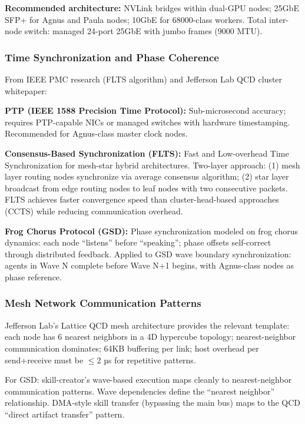 \documentclass[11pt,letterpaper]{article}
\begin{document}
\textbf{Recommended architecture:} NVLink bridges within dual-GPU nodes; 25GbE SFP+ for Agnus and Paula nodes; 10GbE for 68000-class workers. Total inter-node switch: managed 24-port 25GbE with jumbo frames (9000 MTU).

\subsubsection{Time Synchronization and Phase Coherence}

From IEEE PMC research (FLTS algorithm) and Jefferson Lab QCD cluster whitepaper:

\textbf{PTP (IEEE 1588 Precision Time Protocol):} Sub-microsecond accuracy; requires PTP-capable NICs or managed switches with hardware timestamping. Recommended for Agnus-class master clock nodes.

\textbf{Consensus-Based Synchronization (FLTS):} Fast and Low-overhead Time Synchronization for mesh-star hybrid architectures. Two-layer approach: (1) mesh layer routing nodes synchronize via average consensus algorithm; (2) star layer broadcast from edge routing nodes to leaf nodes with two consecutive packets. FLTS achieves faster convergence speed than cluster-head-based approaches (CCTS) while reducing communication overhead.

\textbf{Frog Chorus Protocol (GSD):} Phase synchronization modeled on frog chorus dynamics: each node ``listens'' before ``speaking''; phase offsets self-correct through distributed feedback. Applied to GSD wave boundary synchronization: agents in Wave N complete before Wave N+1 begins, with Agnus-class nodes as phase reference.

\subsubsection{Mesh Network Communication Patterns}

Jefferson Lab's Lattice QCD mesh architecture provides the relevant template: each node has 6 nearest neighbors in a 4D hypercube topology; nearest-neighbor communication dominates; 64KB buffering per link; host overhead per send+receive must be $\leq$2 µs for repetitive patterns.

For GSD: skill-creator's wave-based execution maps cleanly to nearest-neighbor communication patterns. Wave dependencies define the ``nearest neighbor'' relationship. DMA-style skill transfer (bypassing the main bus) maps to the QCD ``direct artifact transfer'' pattern.
\end{document}
